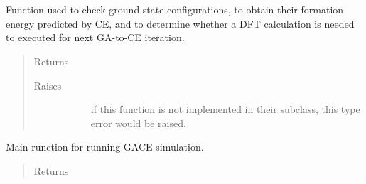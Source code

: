 \documentclass[letterpaper,10pt,english]{sphinxmanual}
\begin{document}
\begin{fulllineitems}
\begin{fulllineitems}
\label{\detokenize{pygace:pygace.gace.AbstractRunner.app}}~
\end{fulllineitems}


\begin{fulllineitems}
\label{\detokenize{pygace:pygace.gace.AbstractRunner.iter_idx}}~
\end{fulllineitems}


\begin{fulllineitems}
\label{\detokenize{pygace:pygace.gace.AbstractRunner.print_gs}}
Function used to check ground-state configurations, to obtain their
formation energy predicted by CE, and to determine whether a DFT
calculation is needed to executed for next GA-to-CE iteration.
\begin{quote}\begin{description}
\item[{Returns}] \leavevmode\begin{description}
\item[{}] \leavevmode
\end{description}

\item[{Raises}] \leavevmode\begin{description}
\item[{}] \leavevmode
if this function is not implemented in their subclass, this type
error would be raised.

\end{description}

\end{description}\end{quote}

\end{fulllineitems}


\begin{fulllineitems}
\label{\detokenize{pygace:pygace.gace.AbstractRunner.run}}
Main runction for running GACE simulation.
\begin{quote}\begin{description}
\item[{Returns}] \leavevmode\begin{description}
\item[{}] \leavevmode
\end{description}


\end{description}
\end{quote}
\end{fulllineitems}
\end{fulllineitems}
\end{document}
